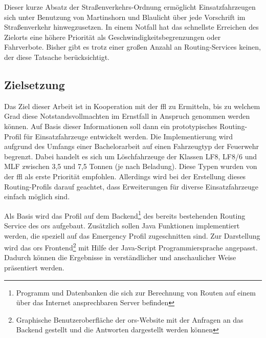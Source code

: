 \vspace{1.2cm}

Dieser kurze Absatz der Straßenverkehrs-Ordnung ermöglicht Einsatzfahrzeugen sich unter Benutzung von Martinshorn und Blaulicht über jede Vorschrift im Straßenverkehr hinwegzusetzen.
In einem Notfall hat das schnellste Erreichen des Zielorts eine höhere Priorität als Geschwindigkeitsbegrenzungen oder Fahrverbote.
Bisher gibt es trotz einer großen Anzahl an Routing-Services keinen, der diese Tatsache berücksichtigt.

\subsection{Zielsetzung}
Das Ziel dieser Arbeit ist in Kooperation mit der \gls{ffl} zu Ermitteln, bis zu welchem Grad diese Notstandsvollmachten im Ernstfall in Anspruch genommen werden können.
Auf Basis dieser Informationen soll dann ein prototypisches Routing-Profil für Einsatzfahrzeuge entwickelt werden.
Die Implementierung wird aufgrund des Umfangs einer Bachelorarbeit auf einen Fahrzeugtyp der Feuerwehr begrenzt.
Dabei handelt es sich um Löschfahrzeuge der Klassen LF8, LF8/6 und MLF zwischen 3,5 und 7,5 Tonnen (je nach Beladung).
Diese Typen wurden von der \gls{ffl} als erste Priorität empfohlen.
Allerdings wird bei der Erstellung dieses Routing-Profils darauf geachtet, dass Erweiterungen für diverse Einsatzfahrzeuge einfach möglich sind.
\vspace{0.5cm}

Als Basis wird das Profil auf dem Backend\footnote{Programm und Datenbanken die sich zur Berechnung von Routen auf einem über das Internet ansprechbaren Server befinden} des bereits bestehenden Routing Service des \gls{ors} aufgebaut.
Zusätzlich sollen Java Funktionen implementiert werden, die speziell auf das Emergency Profil zugeschnitten sind.
Zur Darstellung wird das \gls{ors} Frontend\footnote{Graphische Benutzeroberfläche der \gls{ors}-Website mit der Anfragen an das Backend gestellt und die Antworten dargestellt werden können} mit Hilfe der Java-Script Programmiersprache angepasst.
Dadurch können die Ergebnisse in verständlicher und anschaulicher Weise präsentiert werden.